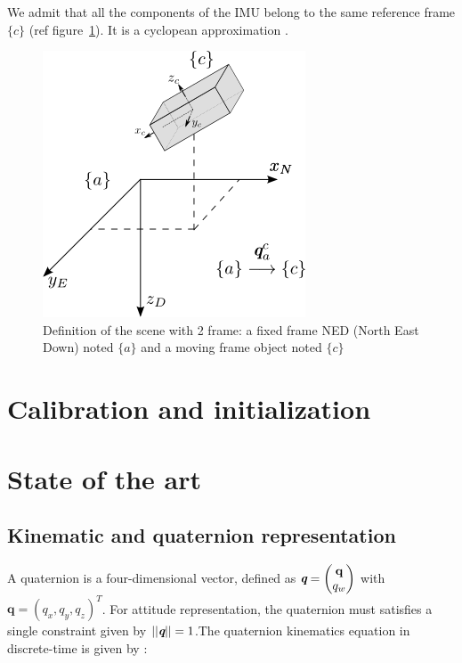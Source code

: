 \documentclass[conference]{IEEEtran}
\begin{document}
We admit that all the components of the IMU belong to the same reference frame $\{c\}$ (ref figure~\ref{Schema_situation}). It is a cyclopean approximation \cite{ouarti2008multimodal} .

\begin{figure}[!h]
\centering
\includegraphics[scale=0.55]{images/Schema_situation.png}
\caption{Definition of the scene with 2 frame:  a fixed frame NED (North East Down) noted $\{a\}$ and a moving frame object noted $\{c\}$}
\label{Schema_situation}
\end{figure}


\section{Calibration and initialization}




\section{State of the art}

\subsection{Kinematic and quaternion representation}


A quaternion is a four-dimensional vector, defined as $ \textbf{\em q} = \begin{pmatrix} \textbf{q} \\ q_w \end{pmatrix} $ with $ \textbf{q} =  ( q_x, q_y, q_z)^T $. For attitude representation, the quaternion must satisfies a single constraint given by  $|| \textbf{\em q} || = 1$.The quaternion kinematics equation in discrete-time is given by :
\end{document}
